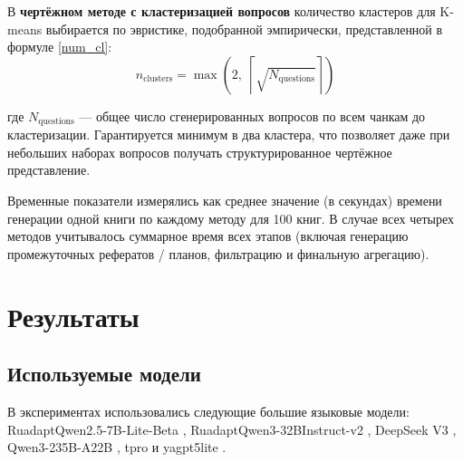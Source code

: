 \documentclass{article}
\begin{document}
В \textbf{чертёжном методе с кластеризацией вопросов} количество кластеров для K-means выбирается по эвристике, подобранной эмпирически, представленной в формуле \eqref{num_cl}:
\begin{equation}\label{num_cl}
  n_{\text{clusters}} = \max\!\left(2,\; \left\lceil \sqrt{N_{\text{questions}}} \right\rceil\right)
\end{equation}

где $N_{\text{questions}}$ — общее число сгенерированных вопросов по всем чанкам до кластеризации. 
Гарантируется минимум в два кластера, что позволяет даже при небольших наборах вопросов получать структурированное чертёжное представление.

Временные показатели измерялись как среднее значение (в секундах) времени генерации одной книги по каждому методу для 100 книг. 
В случае всех четырех методов учитывалось суммарное время всех этапов (включая генерацию промежуточных рефератов / планов, фильтрацию и финальную агрегацию).


\section*{Результаты}

\subsection*{Используемые модели}

В экспериментах использовались следующие большие языковые модели: 
RuadaptQwen2.5-\allowbreak 7B-\allowbreak Lite-\allowbreak Beta \cite{ruadapt}, 
RuadaptQwen3-\allowbreak 32BInstruct-v2 \cite{ruadapt}, 
DeepSeek V3 \cite{deepseek}, 
Qwen3-\allowbreak 235B-\allowbreak A22B \cite{qwen3}, 
tpro \cite{tpro} и yagpt5lite \cite{yagpt}.
\end{document}
